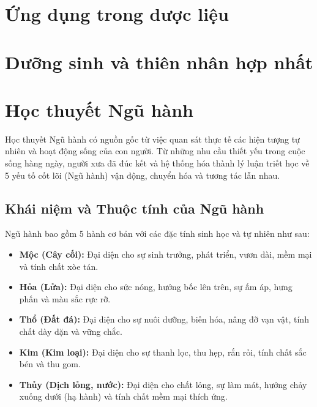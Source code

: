 \section{Ứng dụng trong dược liệu}

\section{Dưỡng sinh và thiên nhân hợp nhất}

\section{Học thuyết Ngũ hành}

Học thuyết Ngũ hành có nguồn gốc từ việc quan sát thực tế các hiện tượng tự nhiên và hoạt động sống của con người. Từ những nhu cầu thiết yếu trong cuộc sống hàng ngày, người xưa đã đúc kết và hệ thống hóa thành lý luận triết học về 5 yếu tố cốt lõi (Ngũ hành) vận động, chuyển hóa và tương tác lẫn nhau.

\subsection{Khái niệm và Thuộc tính của Ngũ hành}
Ngũ hành bao gồm 5 hành cơ bản với các đặc tính sinh học và tự nhiên như sau:
\begin{itemize}
    \item \textbf{Mộc (Cây cối):} Đại diện cho sự sinh trưởng, phát triển, vươn dài, mềm mại và tính chất xòe tán.
    \item \textbf{Hỏa (Lửa):} Đại diện cho sức nóng, hướng bốc lên trên, sự ấm áp, hưng phấn và màu sắc rực rỡ.
    \item \textbf{Thổ (Đất đá):} Đại diện cho sự nuôi dưỡng, biến hóa, nâng đỡ vạn vật, tính chất dày dặn và vững chắc.
    \item \textbf{Kim (Kim loại):} Đại diện cho sự thanh lọc, thu hẹp, rắn rỏi, tính chất sắc bén và thu gom.
    \item \textbf{Thủy (Dịch lỏng, nước):} Đại diện cho chất lỏng, sự làm mát, hướng chảy xuống dưới (hạ hành) và tính chất mềm mại thích ứng.
\end{itemize}

